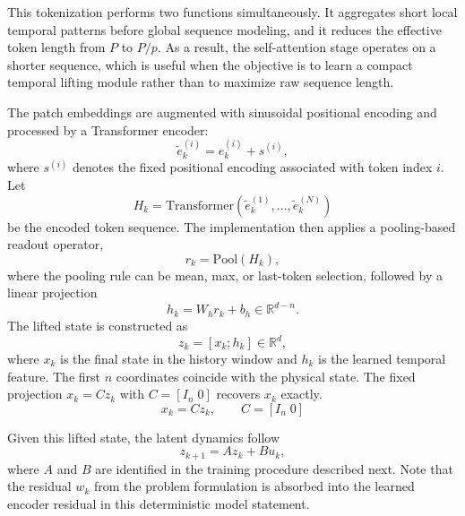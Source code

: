 \documentclass[journal]{IEEEtran}
\begin{document}
This tokenization performs two functions simultaneously. It aggregates short local temporal patterns before global sequence modeling, and it reduces the effective token length from $P$ to $P/p$. As a result, the self-attention stage operates on a shorter sequence, which is useful when the objective is to learn a compact temporal lifting module rather than to maximize raw sequence length.

The patch embeddings are augmented with sinusoidal positional encoding and processed by a Transformer encoder:
\begin{equation}
    \tilde{e}_k^{(i)} = e_k^{(i)} + s^{(i)},
\end{equation}
where $s^{(i)}$ denotes the fixed positional encoding associated with token index $i$. Let
\begin{equation}
    H_k = \mathrm{Transformer}(\tilde{e}_k^{(1)},\ldots,\tilde{e}_k^{(N)})
\end{equation}
be the encoded token sequence. The implementation then applies a pooling-based readout operator,
\begin{equation}
    r_k = \mathrm{Pool}(H_k),
\end{equation}
where the pooling rule can be mean, max, or last-token selection, followed by a linear projection
\begin{equation}
    h_k = W_h r_k + b_h \in \mathbb{R}^{d-n}.
    \label{eq:history_feature}
\end{equation}
The lifted state is constructed as
\begin{equation}
    z_k = [x_k;h_k] \in \mathbb{R}^{d},
    \label{eq:lifted_state_form}
\end{equation}
where $x_k$ is the final state in the history window and $h_k$ is the learned temporal feature. The first $n$ coordinates coincide with the physical state. The fixed projection $x_k=Cz_k$ with $C=[I_n\;0]$ recovers $x_k$ exactly.
\begin{equation}
    x_k = C z_k, \qquad C = [I_n\;0]
    \label{eq:decoder_projection}
\end{equation}

Given this lifted state, the latent dynamics follow
\begin{equation}
    z_{k+1} = A z_k + B u_k,
    \label{eq:temporal_dynamics}
\end{equation}
where $A$ and $B$ are identified in the training procedure described next. Note that the residual $w_k$ from the problem formulation is absorbed into the learned encoder residual in this deterministic model statement.
\end{document}
